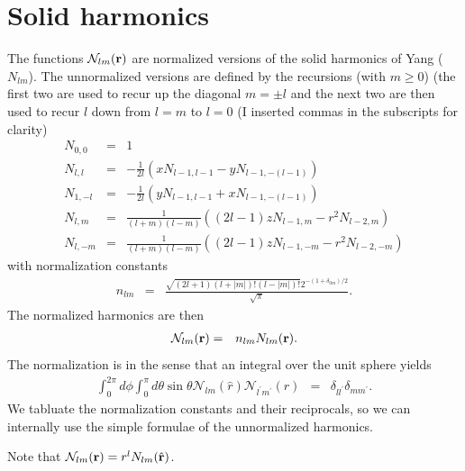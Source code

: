 \documentclass[12pt]{article}
\newcommand{\N}{\mathcal{N}}
\begin{document}
\section{Solid harmonics}

The functions $\N_{lm}(\vb{r})$ are normalized versions of the solid harmonics of Yang ($N_{lm}$).  The unnormalized versions are defined by the recursions (with $m\ge 0$) (the first two are used to recur up the diagonal $m=\pm l$ and the next two are then used to recur $l$ down from $l=m$ to $l=0$ (I inserted commas in the subscripts for clarity)
\begin{eqnarray}
  N_{0,0} & = & 1 \\
  N_{l, l} & = & -\frac{1}{2 l} \left(x N_{l-1,l-1} - y N_{l - 1, -(l - 1)}\right) \\
  N_{1,-l} & = & -\frac{1}{2 l} \left(y N_{l-1,l-1} + x N_{l - 1, -(l - 1)}\right) \\ 
  N_{l, m} & = & \frac{1}{(l+m) (l-m)} \left((2 l-1) z N_{l-1, m}-r^2  N_{l-2, m} \right) \\
  N_{l, -m}& = & \frac{1}{(l+m) (l-m)} \left((2 l-1) z N_{l-1, -m}-r^2 N_{l-2, -m} \right) 
\end{eqnarray}
with normalization constants
\begin{eqnarray}
  n_{lm} & = & \frac{\sqrt{(2 l +1) \left(l +{| m |}\right)! \left(l -{| m |}\right)!}  2^{-(1 + \delta_{0 m})/2}}{\sqrt{\pi}} .
\end{eqnarray}
The normalized harmonics are then
\begin{eqnarray}
  \N_{lm}(\vb{r}) & = & n_{lm} N_{lm}(\vb{r}).
\end{eqnarray}
The normalization is in the sense that an integral over the unit sphere yields
\begin{eqnarray}
  \int_0^{2 \pi} d\phi \int_0^\pi d\theta \sin \theta  \N_{lm} (\hat{r}) \N_{l^\prime m^\prime}(\hat{r})  & = & \delta_{l l^\prime} \delta_{m m^\prime} .
\end{eqnarray}
We tabluate the normalization constants and their reciprocals, so we can internally use the simple formulae of the unnormalized harmonics.

Note that $\N_{lm}(\vb{r}) = r^l N_{lm}(\hat{\vb{r}})$.
\end{document}
